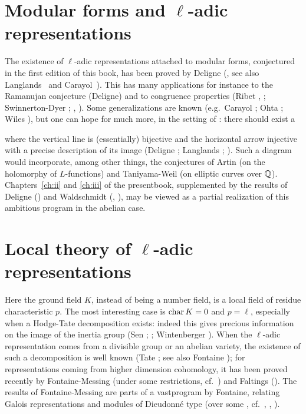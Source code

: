 \section*{Modular forms and \texorpdfstring{$\ell$}{ℓ}-adic representations}
The existence of $\ell$-adic representations attached to modular forms,
conjectured in the first edition of this book, has been proved by Deligne
(\cite{50}, see also Langlands~\cite{65} and Carayol~\cite{49}). This has many
applications for instance to the Ramanujan conjecture (Deligne) and to
congruence properties (Ribet \cite{69}, \cite{71}; Swinnerton-Dyer \cite{81};
\cite{73}, \cite{77}). Some generalizations are known (e.g.\ Carayol \cite{49};
Ohta \cite{68}; Wiles \cite{84}), but one can hope for much more, in the
setting of : there should exist a
\begin{figure}[!hbt]
	\centering
\end{figure}

\noindent
where the vertical line is (essentially) bijective and the horizontal arrow
injective with a precise description of its image (Deligne \cite{51}; Langlands
\cite{66}; \cite{78}). Such a diagram would incorporate, among other things,
the conjectures of Artin (on the holomorphy of $L$-functions) and Taniyama-Weil
(on elliptic curves over $\mathbb{Q}$). Chapters~\ref{ch:ii} and \ref{ch:iii} of the
presentbook, supplemented by the results of Deligne (\cite{53}) and Waldschmidt
(\cite{63}, \cite{83}), may be viewed as a partial realization of this
ambitious program in the abelian case.

\section*{Local theory of \texorpdfstring{$\ell$}{ℓ}-adic representations}
Here the ground field $K$, instead of being a number field, is a local field of
residue characteristic $p$. The most interesting case is $\operatorname{char} K = 0$ and $p =
\ell$, especially when a Hodge-Tate decomposition exists: indeed this gives
precious information on the image of the inertia group (Sen \cite{72};
\cite{79}; Wintenberger \cite{85}). When the $\ell$-adic representation comes
from a divisible group or an abelian variety, the existence of such a
decomposition is well known (Tate \cite{39}; see also Fontaine \cite{60}); for
representations coming from higher dimension cohomology, it has been proved
recently by Fontaine-Messing (under some restrictions, cf.\ \cite{62}) and
Faltings (\cite{55}). The results of Fontaine-Messing are parts of a
vastprogram by Fontaine, relating Galois representations and modules of
Dieudonné type (over some , cf.\ \cite{58},
\cite{59}, \cite{61}).
